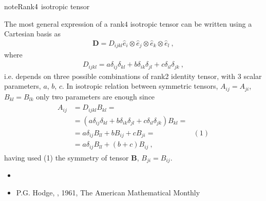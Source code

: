 \documentclass[letterpaper,10pt,english]{jupyterBook}
\begin{document}
\begin{sphinxadmonition}{note}{Rank\sphinxhyphen{}\protect\(4\protect\) isotropic tensor}

\sphinxAtStartPar
The most general expression of a rank\sphinxhyphen{}\(4\) isotropic tensor can be written using a Cartesian basis as
\begin{equation*}
\begin{split}\mathbf{D} = D_{ijkl} \hat{e}_i \otimes \hat{e}_j \otimes \hat{e}_k \otimes \hat{e}_l \ ,\end{split}
\end{equation*}
\sphinxAtStartPar
where
\begin{equation*}
\begin{split}D_{ijkl} = a \delta_{ij} \delta_{kl} + b \delta_{ik} \delta_{jl} + c \delta_{il}\delta_{jk} \ ,\end{split}
\end{equation*}
\sphinxAtStartPar
i.e. depends on three possible combinations of rank\sphinxhyphen{}2 identity tensor, with 3 scalar parameters, \(a\), \(b\), \(c\). In isotropic relation between symmetric tensors, \(A_{ij} = A_{ji}\), \(B_{kl} = B_{lk}\) only two parameters are enough since
\begin{equation*}
\begin{split}\begin{aligned}
  A_{ij} 
  & = D_{ijkl} B_{kl} = \\
  & = \left( a \delta_{ij} \delta_{kl} + b \delta_{ik} \delta_{jl} + c \delta_{il}\delta_{jk} \right) B_{kl} = \\
  & = a \delta_{ij} B_{ll} + b B_{ij} + c  B_{ji} =  & (1) \\
  & = a \delta_{ij} B_{ll} + (b+c) B_{ij} \ ,
\end{aligned}\end{split}
\end{equation*}
\sphinxAtStartPar
having used (1) the symmetry of tensor \(\mathbf{B}\), \(B_{ji} = B_{ij}\).

\sphinxAtStartPar
{}
\begin{itemize}
\item {} 
\sphinxAtStartPar
{}

\item {} 
\sphinxAtStartPar
P.G. Hodge, , 1961, The American Mathematical Monthly

\end{itemize}
\end{sphinxadmonition}
\end{document}
